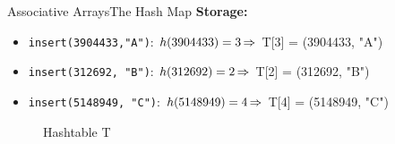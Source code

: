 \begin{frame}{Associative Arrays}{The Hash Map}
  \textbf{Storage:}
  \vspace{0.1em}
  \begin{itemize}
    \setlength\itemsep{0.75em}
    \item<2->
    \small \texttt{insert(3904433,"A")}:
    $h(3904433) = 3 \hspace*{-0.1em} \Rightarrow$
    T[3] = {\color{inkscapeGreen}(3904433, "A")}
    \item<3->
    \small \texttt{insert(312692, "B")}:
    $h(312692) = 2 \hspace*{-0.1em} \Rightarrow$
    T[2] = {\color{inkscapeMaroon}(312692, "B")}
    \item<4->
    \small \texttt{insert(5148949, "C")}:
    $h(5148949) = 4 \hspace*{-0.1em} \Rightarrow$
    T[4] = {\color{inkscapeNavy}(5148949, "C")}
  \end{itemize}
  \vspace{0.1em}
  \begin{figure}
  \caption{Hashtable T}
  \centering
{}%
%
%
  \end{figure}
\end{frame}

